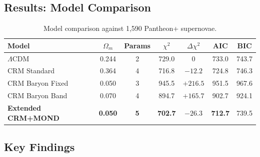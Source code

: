 \documentclass[aps,prd,twocolumn,superscriptaddress,nofootinbib,floatfix]{revtex4-2}
\begin{document}
\subsection{Results: Model Comparison}

\begin{table}[t]
\centering
\caption{Model comparison against 1,590 Pantheon+ supernovae.}
\label{tab:comparison}
\begin{tabular}{lcccccc}
\toprule
\textbf{Model} & $\Omega_m$ & \textbf{Params} & $\chi^2$ & $\Delta\chi^2$ & AIC & BIC \\
\midrule
$\Lambda$CDM & 0.244 & 2 & 729.0 & 0 & 733.0 & 743.7 \\
CRM Standard & 0.364 & 4 & 716.8 & $-12.2$ & 724.8 & 746.3 \\
\midrule
CRM Baryon Fixed & 0.050 & 3 & 945.5 & $+216.5$ & 951.5 & 967.6 \\
CRM Baryon Band & 0.070 & 4 & 894.7 & $+165.7$ & 902.7 & 924.1 \\
\midrule
\textbf{Extended CRM+MOND} & \textbf{0.050} & \textbf{5} & \textbf{702.7} & $\mathbf{-26.3}$ & \textbf{712.7} & 739.5 \\
\bottomrule
\end{tabular}
\end{table}

\subsection{Key Findings}
\end{document}
